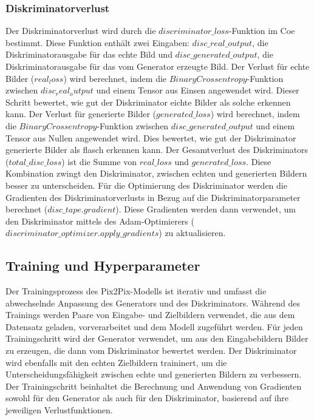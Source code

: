 \subsubsection{Diskriminatorverlust}
Der Diskriminatorverlust wird durch die $discriminator\_loss$-Funktion im Coe bestimmt. Diese Funktion enthält zwei Eingaben: $disc\_real\_output$, die Diskriminatorausgabe für das echte Bild und $disc\_generated\_output$, die Diskriminatorausgabe für das vom Generator erzeugte Bild. Der Verlust für echte Bilder ($real_loss$) wird berechnet, indem die $BinaryCrossentropy$-Funktion zwischen $disc_real_output$ und einem Tensor aus Einsen angewendet wird. Dieser Schritt bewertet, wie gut der Diskriminator eichte Bilder als solche erkennen kann.
Der Verlust für generierte Bilder ($generated\_loss$) wird berechnet, indem die $BinaryCrossentropy$-Funktion zwischen $disc\_generated\_output$ und einem Tensor aus Nullen angewendet wird. Dies bewertet, wie gut der Diskriminator generierte Bilder als flasch erkennen kann.
\newline
Der Gesamtverlust des Diskriminators ($total\_disc\_loss$) ist die Summe von $real\_loss$ und $generated\_loss$. Diese Kombination zwingt den Diskriminator, zwischen echten und generierten Bildern besser zu unterscheiden.
\newline
Für die Optimierung des Diskriminator werden die Gradienten des Diskriminatorverlusts in Bezug auf die Diskriminatorparameter berechnet ($disc\_tape.gradient$). Diese Gradienten werden dann verwendet, um den Diskriminator mittels des Adam-Optimierers ($discriminator\_optimizer.apply\_gradients$) zu aktualisieren.

\subsection{Training und Hyperparameter}
Der Trainingsprozess des Pix2Pix-Modells ist iterativ und umfasst die abwechselnde Anpassung des Generators und des Diskriminators. Während des Trainings werden Paare von Eingabe- und Zielbildern verwendet, die aus dem Datensatz geladen, vorverarbeitet und dem Modell zugeführt werden. Für jeden Trainingschritt wird der Generator verwendet, um aus den Eingabebildern Bilder zu erzeugen, die dann vom Diskriminator bewertet werden. Der Diskriminator wird ebenfalls mit den echten Zielbildern traininert, um die Unterscheidungsfähigkeit zwischen echte und generierten Bildern zu verbessern. Der Trainingschritt beinhaltet die Berechnung und Anwendung von Gradienten sowohl für den Generator als auch für den Diskriminator, basierend auf ihre jeweiligen Verlustfunktionen.
\newline





